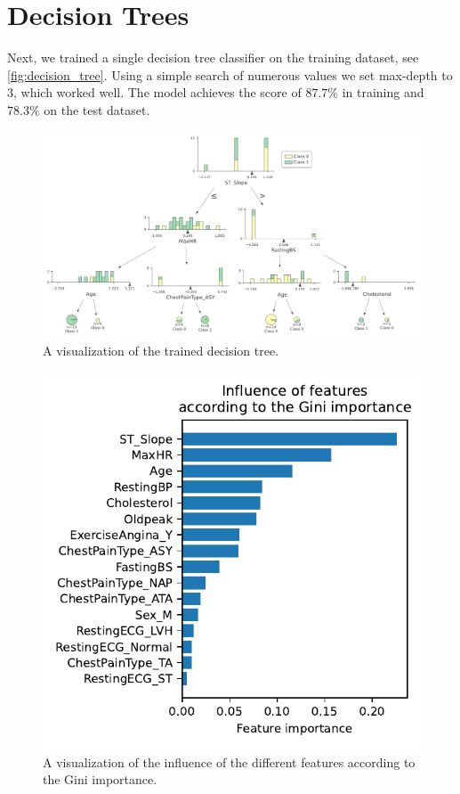 \section{Decision Trees}

Next, we trained a single decision tree classifier on the training dataset, see \autoref{fig:decision_tree}. Using a simple search of numerous values we set max-depth to $3$, which worked well. The model achieves the score of $87.7\%$ in training and $78.3\%$ on the test dataset.

\begin{figure}
    \centering
    \includegraphics[width=1\textwidth]{images/decision_tree.pdf}
    \caption{A visualization of the trained decision tree.}
    \label{fig:decision_tree}
\end{figure}

\begin{figure}
    \centering
    \includegraphics[width=1\columnwidth]{images/random_forest.pdf}
    \caption{A visualization of the influence of the
different features according to the Gini importance.}
    \label{fig:random_forest}
\end{figure}

